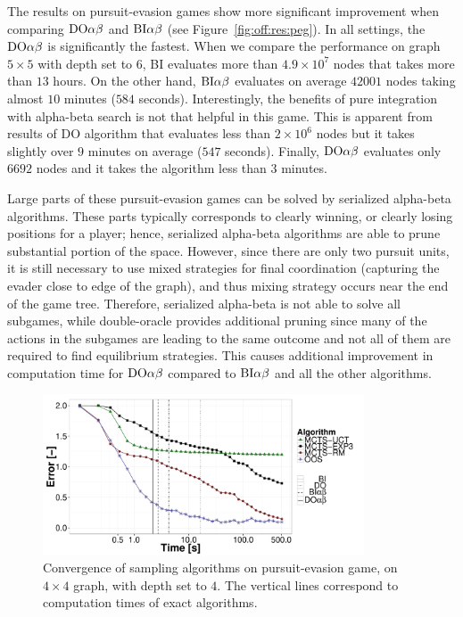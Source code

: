 The results on pursuit-evasion games show more significant improvement when comparing $\textrm{DO}\alpha\beta$ and $\textrm{BI}\alpha\beta$ (see Figure~\ref{fig:off:res:peg}). In all settings, the $\textrm{DO}\alpha\beta$ is significantly the fastest. When we compare the performance on graph $5\times5$ with depth set to $6$, \textsc{BI} evaluates more than $4.9\times10^7$ nodes that takes more than $13$ hours. On the other hand, $\textrm{BI}\alpha\beta$ evaluates on average $42001$ nodes taking almost $10$ minutes ($584$ seconds). Interestingly, the benefits of pure integration with alpha-beta search is not that helpful in this game.
This is apparent from results of \textsc{DO} algorithm that evaluates less than $2\times10^6$ nodes but it takes slightly over $9$ minutes on average ($547$ seconds). Finally, $\textrm{DO}\alpha\beta$ evaluates only $6692$ nodes and it takes the algorithm less than $3$ minutes.

Large parts of these pursuit-evasion games can be solved by serialized alpha-beta algorithms.
These parts typically corresponds to clearly winning, or clearly losing positions for a player; hence, serialized alpha-beta algorithms are able to prune substantial portion of the space. 
However, since there are only two pursuit units, it is still necessary to use mixed strategies for final coordination (capturing the evader close to edge of the graph), and thus mixing strategy occurs near the end of the game tree. 
Therefore, serialized alpha-beta is not able to solve all subgames, while double-oracle provides additional pruning since many of the actions in the subgames are leading to the same outcome and not all of them are required to find equilibrium strategies.
This causes additional improvement in computation time for $\textrm{DO}\alpha\beta$ compared to $\textrm{BI}\alpha\beta$ and all the other algorithms.%

\begin{figure}
\centering
\includegraphics[width=0.85\textwidth]{figures/convergence-peg.pdf}
\caption{Convergence of sampling algorithms on pursuit-evasion game, on $4\times4$ graph, with depth set to $4$. The vertical lines correspond to computation times of exact algorithms.} \label{fig:off:conv:peg}
\end{figure}


